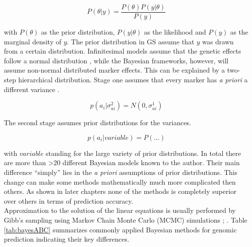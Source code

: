 \begin{equation}
P(\theta | y) = \frac{P(\theta )P(y | \theta)}{P(y)} 
\label{eqn:bayes}
\end{equation}

with $P(\theta )$ as the prior distribution, $P(y|\theta )$ as the likelihood and $P(y)$
as the marginal density of $y$. The prior distribution in GS assume that $y$ was drawn
from a certain distribution. Infinitesimal models assume that the genetic effects follow a
normal distribution \cite{legarra2018}, while the Bayesian frameworks, however, will
assume non-normal distributed marker effects. This can be explained by a two-step
hierarchical distribution. Stage one assumes that every marker has \textit{a priori} a
different variance \cite{legarra2018}.

\begin{equation}
p(a_i|\sigma_{ai}^2) = N (0,\sigma^1_{ai})
 \label{eqn:stageonbayes}
\end{equation}

The second stage assumes prior distributions for the variances.

\begin{equation}
p(a_i| variable ) = P(\dots )
 \label{eqn:stagetwobayes}
\end{equation}

with $variable$ standing for the large variety of prior distributions. In total there are
more than >20 different Bayesian models known to the author. Their main difference
``simply'' lies in the \textit{a priori} assumptions of prior distributions. This change
can make some methods mathematically much more complicated then others. As shown in later
chapters none of the methods is completely superior over others in terms of
prediction accuracy. \\
Approximation to the solution of the linear equations is usually performed by Gibb's
sampling using Markov Chain Monte Carlo (MCMC) simulations \cite{dlc2009}; \cite{BGLR}.
Table \ref{tab:bayesABC} summarizes commonly applied Bayesian methods for genomic
prediction indicating their key differences.

